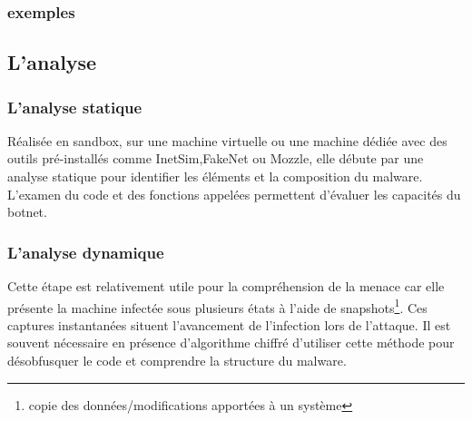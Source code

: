 
\subsubsection{exemples}




\subsection{L'analyse} 
\subsubsection{L'analyse statique}
Réalisée en sandbox, sur une machine virtuelle ou une machine dédiée avec des outils pré-installés comme InetSim,FakeNet ou Mozzle, elle débute par une analyse statique pour identifier les éléments et la composition du malware.
L'examen du code et des fonctions appelées permettent d'évaluer les capacités du botnet.
\subsubsection{L'analyse dynamique} 
Cette étape est relativement utile pour la compréhension de la menace car elle présente la machine infectée sous plusieurs états à l'aide de snapshots\footnote{copie des données/modifications apportées à un système}.
Ces captures instantanées situent l'avancement de l'infection lors de l'attaque.
Il est souvent nécessaire en présence d'algorithme chiffré d'utiliser cette méthode pour désobfusquer le code et comprendre la structure du malware.



